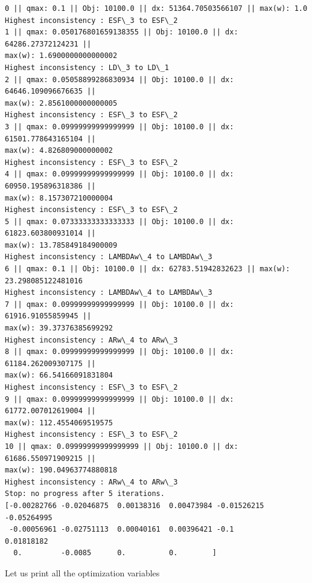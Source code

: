 \documentclass[11pt]{article}
\begin{document}
    \begin{Verbatim}[commandchars=\\\{\}]
0 || qmax: 0.1 || Obj: 10100.0 || dx: 51364.70503566107 || max(w): 1.0
Highest inconsistency : ESF\_3 to ESF\_2
1 || qmax: 0.050176801659138355 || Obj: 10100.0 || dx: 64286.27372124231 ||
max(w): 1.6900000000000002
Highest inconsistency : LD\_3 to LD\_1
2 || qmax: 0.05058899286830934 || Obj: 10100.0 || dx: 64646.109096676635 ||
max(w): 2.8561000000000005
Highest inconsistency : ESF\_3 to ESF\_2
3 || qmax: 0.09999999999999999 || Obj: 10100.0 || dx: 61501.778643165104 ||
max(w): 4.826809000000002
Highest inconsistency : ESF\_3 to ESF\_2
4 || qmax: 0.09999999999999999 || Obj: 10100.0 || dx: 60950.195896318386 ||
max(w): 8.157307210000004
Highest inconsistency : ESF\_3 to ESF\_2
5 || qmax: 0.07333333333333333 || Obj: 10100.0 || dx: 61823.603800931014 ||
max(w): 13.785849184900009
Highest inconsistency : LAMBDAw\_4 to LAMBDAw\_3
6 || qmax: 0.1 || Obj: 10100.0 || dx: 62783.51942832623 || max(w):
23.298085122481016
Highest inconsistency : LAMBDAw\_4 to LAMBDAw\_3
7 || qmax: 0.09999999999999999 || Obj: 10100.0 || dx: 61916.91055859945 ||
max(w): 39.37376385699292
Highest inconsistency : ARw\_4 to ARw\_3
8 || qmax: 0.09999999999999999 || Obj: 10100.0 || dx: 61184.262009307175 ||
max(w): 66.54166091831804
Highest inconsistency : ESF\_3 to ESF\_2
9 || qmax: 0.09999999999999999 || Obj: 10100.0 || dx: 61772.007012619004 ||
max(w): 112.4554069519575
Highest inconsistency : ESF\_3 to ESF\_2
10 || qmax: 0.09999999999999999 || Obj: 10100.0 || dx: 61686.550971909215 ||
max(w): 190.04963774880818
Highest inconsistency : ARw\_4 to ARw\_3
Stop: no progress after 5 iterations.
[-0.00282766 -0.02046875  0.00138316  0.00473984 -0.01526215 -0.05264995
 -0.00056961 -0.02751113  0.00040161  0.00396421 -0.1         0.01818182
  0.         -0.0085      0.          0.        ]
    \end{Verbatim}

    Let us print all the optimization variables
\end{document}
